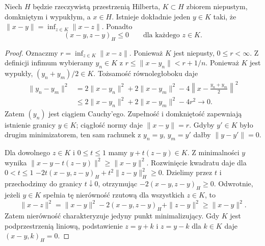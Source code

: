 \begin{lemat}
\label{lem:pde11-projection}
Niech $H$ będzie rzeczywistą przestrzenią Hilberta,
$K\subset H$ zbiorem niepustym, domkniętym i wypukłym,
a $x\in H$. Istnieje dokładnie jeden $y\in K$ taki, że
$\|x-y\|=\inf_{z\in K}\|x-z\|$. Ponadto
\[ (x-y,z-y)_H\le0\qquad\text{dla każdego }z\in K. \]
\end{lemat}
\begin{proof}
Oznaczmy $r=\inf_{z\in K}\|x-z\|$. Ponieważ $K$ jest
niepusty, $0\le r<\infty$. Z definicji infimum wybieramy
$y_n\in K$ z $r\le\|x-y_n\|<r+1/n$. Ponieważ $K$ jest wypukły,
$(y_n+y_m)/2\in K$. Tożsamość równoległoboku daje
\begin{align*}
\|y_n-y_m\|^2
&=2\|x-y_n\|^2+2\|x-y_m\|^2
 -4\left\|x-\frac{y_n+y_m}{2}\right\|^2\\
&\le 2\|x-y_n\|^2+2\|x-y_m\|^2-4r^2\longrightarrow0.
\end{align*}
Zatem $(y_n)$ jest ciągiem Cauchy'ego. Zupełność i domkniętość
zapewniają istnienie granicy $y\in K$; ciągłość normy
daje $\|x-y\|=r$.
Gdyby $y'\in K$ było drugim minimizatorem, ten sam rachunek
z $y_n=y$, $y_m=y'$ dałby $\|y-y'\|=0$.

Dla dowolnego $z\in K$ i $0\le t\le1$ mamy
$y+t(z-y)\in K$. Z minimalności $y$ wynika
$\|x-y-t(z-y)\|^2\ge\|x-y\|^2$.
Rozwinięcie kwadratu daje dla $0<t\le1$
$-2t(x-y,z-y)_H+t^2\|z-y\|_H^2\ge0$.
Dzielimy przez $t$ i przechodzimy do granicy
$t\downarrow0$, otrzymując $-2(x-y,z-y)_H\ge0$.
Odwrotnie, jeżeli $y\in K$ spełnia tę nierówność
rzutową dla wszystkich $z\in K$, to
\[
 \|x-z\|^2=\|x-y\|^2-2(x-y,z-y)_H+\|z-y\|^2
 \ge\|x-y\|^2.
\]
Zatem nierówność charakteryzuje jedyny punkt minimalizujący.
Gdy $K$ jest podprzestrzenią liniową, podstawienie
$z=y+k$ i $z=y-k$ dla $k\in K$ daje $(x-y,k)_H=0$.
\end{proof}


